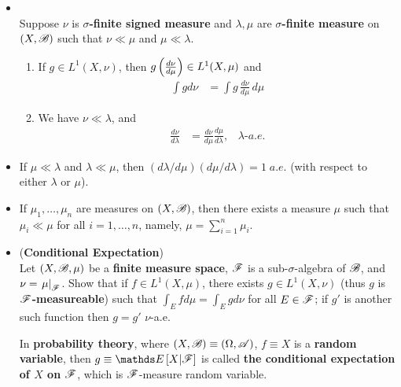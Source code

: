 \documentclass[11pt]{article}
\begin{document}
\begin{itemize}
\item \begin{proposition}\citep{folland2013real}\\
 Suppose $\nu$ is \textbf{$\sigma$-finite signed measure} and $\lambda, \mu$ are \textbf{$\sigma$-finite measure} on $(X,{\mathscr B})$ such that $\nu\ll \mu$ and $\mu \ll \lambda$.
 \begin{enumerate}
 \item If $g\in L^{1}(X, \nu)$, then $g\left(\frac{d \nu}{d\mu}\right)\in L^{1}(X,\mu)$ and
 \begin{align*}
 \int g d\nu &= \int g\, \frac{d \nu}{d\mu}\, d\mu
 \end{align*}
 \item We have $\nu \ll \lambda$, and 
 \begin{align*}
 \frac{d\nu}{d\lambda} &= \frac{d\nu}{d\mu}\frac{d\mu}{d\lambda}, \;\;\; \lambda\text{-}a.e.
 \end{align*}
 \end{enumerate}
\end{proposition}

\item \begin{corollary}
If $\mu \ll \lambda$ and $\lambda \ll \mu$, then $(d\lambda / d\mu)(d\mu / d\lambda) = 1\; a.e$. (with respect to either $\lambda$ or $\mu$).
\end{corollary}

\item \begin{proposition} If $\mu_{1}, \ldots, \mu_{n}$ are measures on $(X,{\mathscr B})$, then there exists a measure $\mu$ such that $\mu_{i}\ll \mu$ for all $i=1,\ldots,n$, namely, $\mu= \sum_{i=1}^{n}\mu_{i}$.
\end{proposition}

\item  \begin{exercise} (\textbf{Conditional Expectation})\\
Let $(X, {\mathscr B}, \mu)$ be a \textbf{finite measure space}, ${\mathscr F}$ is a sub-$\sigma$-algebra of ${\mathscr B}$, and $\nu= \left.{\mu}\right\vert_{{\mathscr F}}$. Show that if $f\in L^{1}(X, \mu)$, there exists $g\in L^{1}(X, \nu)$ (thus $g$ is \textbf{${\mathscr F}$-measureable}) such that $\int_{E} f d\mu = \int_{E} g d\nu $ for all $E\in {\mathscr F}$; if $g'$ is another such function then $g= g'$ $\nu$-a.e. 

In \textbf{probability theory}, where $(X,{\mathscr B})\equiv (\Omega, {\mathscr A})$, $f\equiv X$ is a \textbf{random variable}, then $g\equiv \E{}{X| \srF}$ is called \textbf{the conditional expectation of $X$ on ${\mathscr F}$}, which is ${\mathscr F}$-measure random variable.
\end{exercise}
\end{itemize}
\end{document}
